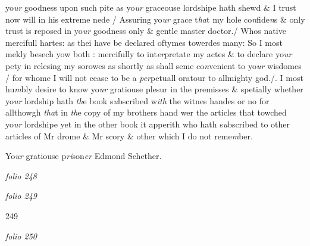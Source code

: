 \documentclass[12pt, a4paper]{book}
\begin{document}
            			yo\textit{ur} goodness upon such pite as yo\textit{ur} graceouse lordshipe hath shewd \& 
            			I trust now will in his extreme nede / Assuring yo\textit{ur} grace t\textit{ha}t my 
hole co\textit{n}fide\textit{n}s \& only trust is reposed in yo\textit{ur} goodness only \& gentle
master doctor./ Whos native mercifull hartes: as thei have 
be declared oftymes towerdes many: So I most mekly besech yow
both : mercifully to int\textit{er}pretate my actes \& to declare yo\textit{ur }pety in
relesing my sorowes as shortly as shall seme co\textit{n}venient to yo\textit{ur}
wisdomes / for whome I will not cease to be a \textit{per}petuall oratour
to allmighty god./. I most hu\textit{m}bly desire to know yo\textit{ur} gratiouse plesur
            			in the premisses \& spetially whether yo\textit{ur} lordship hath \textit{th}e book s\textit{u}bscribed
w\textit{ith} the witnes handes or no for allthowgh\textit{ tha}t in \textit{th}e copy of my brothers
            			hand wer the articles that towched yo\textit{ur} lordshipe yet in the other 
            			book it apperith who hath s\textit{u}bscribed to other articles of Mr drome \& 
            			Mr scory \& other which I do not reme\textit{m}ber. 
            		
		\ifthenelse{\isodd{\thepage}}
		{\reversemarginpar}
		{\normalmarginpar}
		Yo\textit{ur} gratiouse p\textit{ri}son\textit{er}
Edmond Schether.

\dotfill
						\newpage
{}

\textit{folio 248}


         \vspace*{4cm}
         
\dotfill
						

\textit{folio 249}


\begin{flushright}{\color{Mahogany}249}\end{flushright}

\dotfill
						\newpage
{}

\textit{folio 250}


 	\vspace*{4cm}

\dotfill
						  \section*{}
\end{document}
